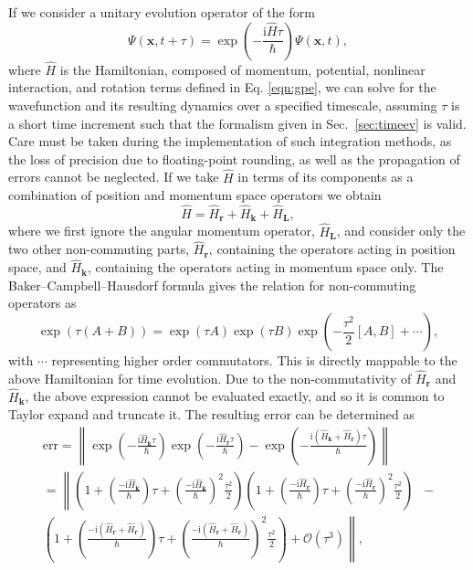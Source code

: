 If we consider a unitary evolution operator of the form
\begin{equation}\label{eqn:1}
\Psi(\mathbf{x},t+\tau) = \exp\left( -\frac{\text{i}\hat{H}\tau}{\hbar}\right)\Psi(\mathbf{x},t),
\end{equation}
where $\hat{H}$ is the Hamiltonian, composed of momentum, potential, nonlinear interaction, and rotation terms defined in Eq. \eqref{eqn:gpe}, we can solve for the wavefunction and its resulting dynamics over a specified timescale, assuming $\tau$ is a short time increment such that the formalism given in Sec.~\ref{sec:timeev} is valid. Care must be taken during the implementation of such integration methods, as the loss of precision due to floating-point rounding, as well as the propagation of errors cannot be neglected. If we take $\hat{H}$ in terms of its components as a combination of position and momentum space operators we obtain
\begin{equation}\label{eqn:2}
\hat{H} = \hat{H}_{\textbf{r}} + \hat{H}_{\textbf{k}} + \hat{H}_{\textbf{L}},
\end{equation}
where we first ignore the angular momentum operator, $\hat{H}_{\textbf{L}}$, and consider only the two other non-commuting parts, $\hat{H}_{\textbf{r}}$, containing the operators acting in position space, and $\hat{H}_{\textbf{k}}$, containing the operators acting in momentum space only. The Baker--Campbell--Hausdorf formula \cite{NUM:Weyrauch_cpc_2009} gives the relation for non-commuting operators as
\begin{equation}
    \exp\left( \tau(A+B) \right) = \exp\left(\tau A\right)\exp\left(\tau B\right)\exp\left(-\frac{\tau^2}{2}[A,B] + \cdots\right),
\end{equation}
with $\cdots$ representing higher order commutators. This is directly mappable to the above Hamiltonian for time evolution. Due to the non-commutativity of $\hat{H}_{\textbf{r}}$ and $\hat{H}_{\textbf{k}}$, the above expression cannot be evaluated exactly, and so it is common to Taylor expand and truncate it. The resulting error can be determined as
\begin{subequations}\label{eqn:error_calc}
\begin{align}
    \text{err} = \left\| \exp\left(-\frac{\textrm{i}\hat{H}_{\textbf{k}}\tau}{\hbar}\right)\exp\left(-\frac{\textrm{i}\hat{H}_{\textbf{r}}\tau}{\hbar}\right) - \exp\left(-\frac{\textrm{i}(\hat{H}_{\textbf{k}} + \hat{H}_{\textbf{r}})\tau}{\hbar}\right) \right\| \\
    = \left\|  \left(1 + \left(\frac{-\textrm{i}\hat{H}_{\textbf{k}}}{\hbar}\right)\tau + \left(\frac{-\textrm{i}\hat{H}_{\textbf{k}}}{\hbar}\right)^2\frac{\tau^2}{2}  \right)\left(1 + \left(\frac{-\textrm{i}\hat{H}_{\textbf{r}}}{\hbar}\right)\tau + \left(\frac{-\textrm{i}\hat{H}_{\textbf{r}}}{\hbar}\right)^2\frac{\tau^2}{2}  \right) \right. &- \nonumber \\ \left. \left(1 + \left(\frac{-\textrm{i}(\hat{H}_{\textbf{r}} + \hat{H}_{\textbf{r}})}{\hbar}\right)\tau + \left(\frac{-\textrm{i}(\hat{H}_{\textbf{r}} + \hat{H}_{\textbf{r}})}{\hbar}\right)^2\frac{\tau^2}{2}  \right)  + \mathcal{O}(\tau^3) \right\|,
\end{align}
\end{subequations}
